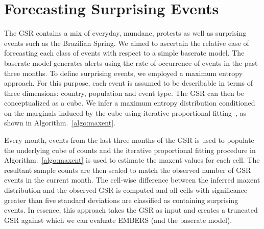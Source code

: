\section{Forecasting Surprising Events}
\label{sec:suprising}
The GSR contains a mix of everyday, mundane, protests as well as surprising events such as the Brazilian Spring.
We aimed to ascertain the relative ease of forecasting each class of events
with respect to a simple baserate model.
The baserate model generates alerts using the rate of occurrence of events in the past three months.
To define surprising events,
we employed a maximum entropy approach. For this purpose, each event is assumed
to be describable
in terms of three dimensions: country, population and event type. The GSR can then be conceptualized
as a cube. We infer a maximum entropy distribution conditioned on the marginals
induced by the cube using iterative proportional fitting~\cite{bishop2007discrete}, as shown in Algorithm.~\ref{algo:maxent}.

%
%

Every month, events from the last three months of the
GSR is used to populate the underlying cube of counts and the iterative proportional fitting procedure in Algorithm.~\ref{algo:maxent} is
used to estimate the maxent values for each cell. The resultant sample counts are then scaled to
match the observed number of GSR events in the current month. The cell-wise difference between the inferred
maxent distribution and the observed GSR is computed and all cells with significance greater than five standard
deviations are classified as containing surprising events. In essence, this approach takes the GSR as input and
creates a truncated GSR against which we can evaluate EMBERS (and the baserate model).

